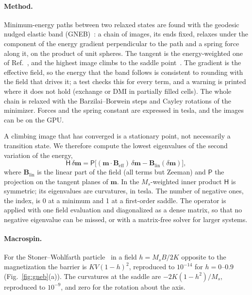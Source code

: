 \documentclass{article}      %
\newcommand{\vm}{\bm{m}}
\newcommand{\vB}{\bm{B}}
\begin{document}
\paragraph{Method.}
Minimum-energy paths between two relaxed states are found with the geodesic nudged
elastic band (GNEB)~\cite{bessarab2015}: a chain of images, its ends fixed, relaxes
under the component of the energy gradient perpendicular to the path and a spring force
along it, on the product of unit spheres. The tangent is the energy-weighted one of
Ref.~\cite{henkelman2000a}, and the highest image climbs to the saddle
point~\cite{henkelman2000b}. The gradient is the effective field, so the energy that the
band follows is consistent to rounding with the field that drives it; a test checks
this for every term, and a warning is printed where it does not hold (exchange or DMI in
partially filled cells). The whole chain is relaxed with the Barzilai--Borwein steps and
Cayley rotations of the minimizer. Forces and the spring constant are expressed in
tesla, and the images can be on the GPU.

A climbing image that has converged is a stationary point, not necessarily a transition
state. We therefore compute the lowest eigenvalues of the second variation of the energy,
\begin{equation}
  \mathsf{H}\,\delta\vm = \mathsf{P}\bigl[(\vm\cdot\vB_{\mathrm{eff}})\,\delta\vm
  - \vB_{\mathrm{lin}}(\delta\vm)\bigr],
  \label{eq:hessian}
\end{equation}
where $\vB_{\mathrm{lin}}$ is the linear part of the field (all terms but Zeeman) and
$\mathsf{P}$ the projection on the tangent planes of $\vm$. In the $M_s$-weighted inner
product $\mathsf{H}$ is symmetric; its eigenvalues are curvatures, in tesla. The number of
negative ones, the index, is 0 at a minimum and 1 at a first-order saddle. The operator is
applied with one field evaluation and diagonalized as a dense matrix, so that no negative
eigenvalue can be missed, or with a matrix-free solver for larger systems.

\paragraph{Macrospin.}
For the Stoner--Wohlfarth particle~\cite{stoner1948} in a field $h=M_sB/2K$ opposite to the
magnetization the barrier is $KV(1-h)^2$, reproduced to $10^{-14}$ for $h=0$--$0.9$
(Fig.~\ref{fig:gneb}(a)). The curvatures at the saddle are $-2K(1-h^2)/M_s$, reproduced
to $10^{-9}$, and zero for the rotation about the axis.
\end{document}
